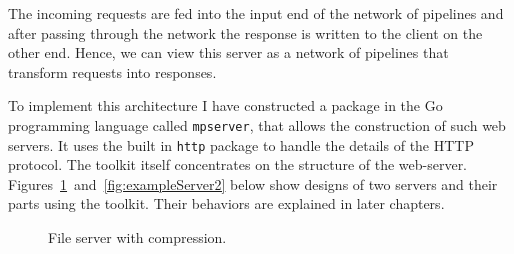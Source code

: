 The incoming requests are fed into the input end of the network of pipelines and 
after passing through the network the response is written to the
client on the other end. Hence, we can view this server
as a network of pipelines that transform requests into responses.

To implement this architecture I have constructed a package in the Go programming 
language called \texttt{mpserver}, that allows the construction of such web servers.
It uses the built in \texttt{http} package to handle the details of
the HTTP~\cite{http} protocol. The toolkit itself concentrates on the 
structure of the web-server. 
Figures~\ref{fig:exampleServer1}~and~\ref{fig:exampleServer2} 
below show designs of two servers and their parts
using the toolkit. Their behaviors are explained in later chapters.

\begin{figure}[h]
\centering
{}
\caption[scale=1.0]{File server with compression.}
\label{fig:exampleServer1}
\end{figure}

